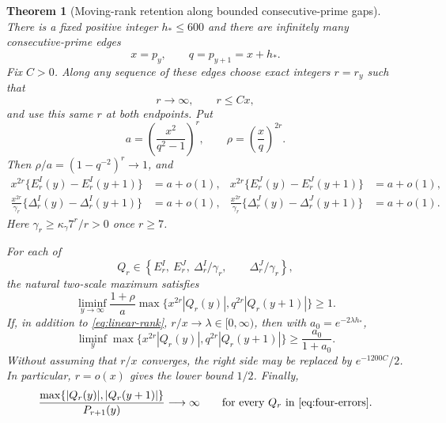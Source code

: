 \documentclass[11pt]{article}
\newtheorem{theorem}{Theorem}[section]
\theoremstyle{definition}
\theoremstyle{remark}
\newcommand{\DeltaI}{\Delta^{I}}
\newcommand{\DeltaJ}{\Delta^{J}}
\newcommand{\EI}{E^{I}}
\newcommand{\EJ}{E^{J}}
\begin{document}
\begin{theorem}[Moving-rank retention along bounded consecutive-prime gaps]
\label{thm:main}
There is a fixed positive integer $h_*\le600$ and there are infinitely many
consecutive-prime edges
\begin{equation}
 x=p_y,\qquad q=p_{y+1}=x+h_*.
 \label{eq:fixed-edges}
\end{equation}
Fix $C>0$.  Along any sequence of these edges choose exact integers
$r=r_y$ such that
\begin{equation}
 r\longrightarrow\infty,\qquad r\le Cx,
 \label{eq:linear-rank}
\end{equation}
and use this same $r$ at both endpoints.  Put
\begin{equation}
 a=\left(\frac{x^2}{q^2-1}\right)^r,\qquad
 \rho=\left(\frac{x}{q}\right)^{2r}.
 \label{eq:a-rho}
\end{equation}
Then $\rho/a=(1-q^{-2})^r\to1$, and
\begin{align}
 x^{2r}\{\EI_r(y)-\EI_r(y+1)\}&=a+o(1),
 &x^{2r}\{\EJ_r(y)-\EJ_r(y+1)\}&=a+o(1),
 \label{eq:scalar-jumps}\\
 \frac{x^{2r}}{\gamma_r}\{\DeltaI_r(y)-\DeltaI_r(y+1)\}&=a+o(1),
 &\frac{x^{2r}}{\gamma_r}\{\DeltaJ_r(y)-\DeltaJ_r(y+1)\}&=a+o(1).
 \label{eq:endpoint-jumps}
\end{align}
Here $\gamma_r\ge\kappa_\gamma7^r/r>0$ once $r\ge7$.

For each of
\begin{equation}
 Q_r\in\left\{\EI_r,\ \EJ_r,\ \DeltaI_r/\gamma_r,\qquad
                         \DeltaJ_r/\gamma_r\right\},
 \label{eq:four-errors}
\end{equation}
the natural two-scale maximum satisfies
\begin{equation}
 \liminf_{y\to\infty}\frac{1+\rho}{a}
 \max\{x^{2r}|Q_r(y)|,q^{2r}|Q_r(y+1)|\}\ge1.
 \label{eq:natural-profile}
\end{equation}
If, in addition to \eqref{eq:linear-rank},
$r/x\to\lambda\in[0,\infty)$, then with
$a_0=e^{-2\lambda h_*}$,
\begin{equation}
 \liminf_y\max\{x^{2r}|Q_r(y)|,q^{2r}|Q_r(y+1)|\}
 \ge\frac{a_0}{1+a_0}.
 \label{eq:lambda-profile}
\end{equation}
Without assuming that $r/x$ converges, the right side may be replaced by
$e^{-1200C}/2$.  In particular, $r=o(x)$ gives the lower bound $1/2$.
Finally,
\begin{equation}
 \frac{\max\{|Q_r(y)|,|Q_r(y+1)|\}}{P_{r+1}(y)}
 \longrightarrow\infty
 \qquad\text{for every $Q_r$ in \eqref{eq:four-errors}.}
 \label{eq:next-rank-divergence}
\end{equation}
\end{theorem}
\end{document}

